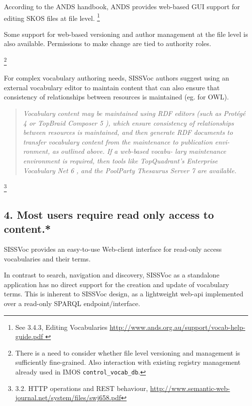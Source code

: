 \documentclass[10pt,a4paper]{article}
\newenvironment{italicquotes}
{\begin{quote}\itshape}
{\end{quote}}
\begin{document}
\begin{flushleft}
%    
  According to the ANDS handbook, ANDS provides web-based GUI support for editing SKOS files at file level. 
  \footnote { See 3.4.3, Editing Vocabularies \url{ http://www.ands.org.au/support/vocab-help-guide.pdf } 
  }

  Some support for web-based versioning and author management at the file level
is also available. Permissions to make change are tied to authority roles.

  \footnote {
    There is a need to consider whether file level versioning and management is
  sufficiently fine-grained. Also interaction with existing registry management
  already used in IMOS \texttt{control\_vocab\_db}. 
  }
  
  For complex vocabulary authoring needs, SISSVoc authors suggest using an
external vocabulary editor to maintain content that can also ensure that consistency of
relationships between resources is maintained (eg. for OWL). 

  \begin{italicquotes} 
  Vocabulary content may be maintained using RDF editors (such as Protégé 4 or
TopBraid Composer 5 ), which ensure consistency of
relationships between resources is maintained, and
then generate RDF documents to transfer vocabulary
content from the maintenance to publication envi-
ronment, as outlined above. If a web-based vocabu-
lary maintenance environment is required, then tools
like TopQuadrant’s Enterprise Vocabulary Net 6 , and
the PoolParty Thesaurus Server 7 are available.
  \end{italicquotes} 

  \footnote {
    3.2. HTTP operations and REST behaviour, 
\url{http://www.semantic-web-journal.net/system/files/swj658.pdf} 
  }


\subsection{ 
  4. Most users require read only access to content.* 
}
  SISSVoc provides an easy-to-use Web-client interface for read-only access vocabularies and their terms.

  In contrast to search, navigation and discovery, SISSVoc as a standalone application has no direct 
  support for the creation and update of vocabulary terms. This is inherent to SISSVoc design, as a 
  lightweight web-api implemented over a read-only SPARQL endpoint/interface.  


\end{flushleft}
\end{document}
